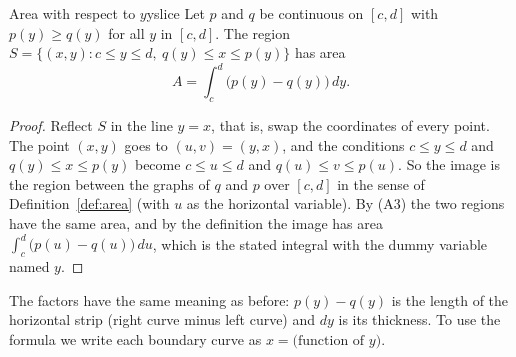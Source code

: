 \documentclass[11pt]{article}
\begin{document}
\begin{thm}{Area with respect to $y$}{yslice}
Let $p$ and $q$ be continuous on $[c,d]$ with $p(y)\ge q(y)$ for all $y$ in $[c,d]$. The region $S=\{(x,y):c\le y\le d,\ q(y)\le x\le p(y)\}$ has area
\[
A=\int_c^d\bigl(p(y)-q(y)\bigr)\,dy .
\]
\end{thm}
\begin{proof}
Reflect $S$ in the line $y=x$, that is, swap the coordinates of every point. The point $(x,y)$ goes to $(u,v)=(y,x)$, and the conditions $c\le y\le d$ and $q(y)\le x\le p(y)$ become $c\le u\le d$ and $q(u)\le v\le p(u)$. So the image is the region between the graphs of $q$ and $p$ over $[c,d]$ in the sense of Definition~\ref{def:area} (with $u$ as the horizontal variable). By (A3) the two regions have the same area, and by the definition the image has area $\int_c^d\bigl(p(u)-q(u)\bigr)\,du$, which is the stated integral with the dummy variable named $y$.
\end{proof}

The factors have the same meaning as before: $p(y)-q(y)$ is the length of the horizontal strip (right curve minus left curve) and $dy$ is its thickness. To use the formula we write each boundary curve as $x=\text{(function of }y)$.
\end{document}
